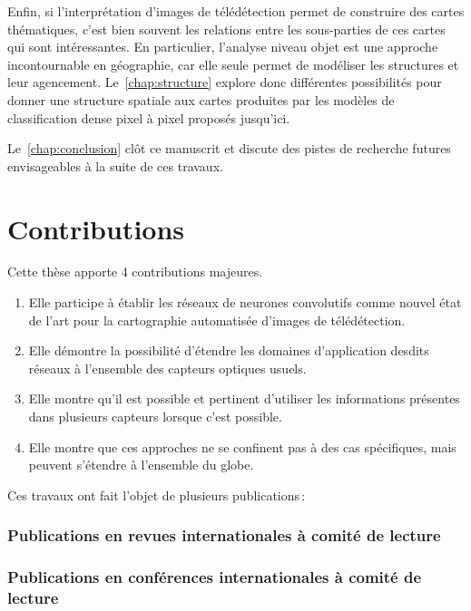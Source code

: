 Enfin, si l'interprétation d'images de télédétection permet de construire des cartes thématiques, c'est bien souvent les relations entre les sous-parties de ces cartes qui sont intéressantes. En particulier, l'analyse niveau objet est une approche incontournable en géographie, car elle seule permet de modéliser les structures et leur agencement. Le~\cref{chap:structure} explore donc différentes possibilités pour donner une structure spatiale aux cartes produites par les modèles de classification dense pixel à pixel proposés jusqu'ici.

Le~\cref{chap:conclusion} clôt ce manuscrit et discute des pistes de recherche futures envisageables à la suite de ces travaux.

\section{Contributions}

Cette thèse apporte 4 contributions majeures.
\begin{enumerate}
  \item Elle participe à établir les réseaux de neurones convolutifs comme nouvel état de l'art pour la cartographie automatisée d'images de télédétection.
  \item Elle démontre la possibilité d'étendre les domaines d'application desdits réseaux à l'ensemble des capteurs optiques usuels.
  \item Elle montre qu'il est possible et pertinent d'utiliser les informations présentes dans plusieurs capteurs lorsque c'est possible.
  \item Elle montre que ces approches ne se confinent pas à des cas spécifiques, mais peuvent s'étendre à l'ensemble du globe.
\end{enumerate}

Ces travaux ont fait l'objet de plusieurs publications\,:

\subsubsection*{Publications en revues internationales à comité de lecture}



\subsubsection*{Publications en conférences internationales à comité de lecture}






\medskip



%
%
\printbibliography
